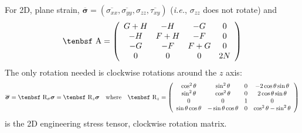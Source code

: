 \documentclass[11pt]{article}
\renewcommand{\vec}[1]{\boldsymbol{#1}}
\def\A{\hbox{\tenbsf A}}
\def\R{\hbox{\tenbsf R}}
\def\s#1{\sigma_{#1}}
\def\t#1{\tau_{#1}}
\begin{document}
For 2D, plane strain, $\overline{\vec\sigma} = (\overline{\s{xx}}, \overline{\s{yy}}, \s{zz}, \overline{\t{xy}})$ ({\em i.e.}, $\s{zz}$ does not rotate) and
\begin{equation}
      \A = \left( \begin{array}{cccc}
                       G+H & -H & -G & 0 \\
                       -H & F+H & -F & 0 \\
                       -G & -F & F+G & 0 \\
                       0 & 0 & 0 & 2N
                       \end{array} \right)
\end{equation}
The only rotation needed is clockwise rotations around the $z$ axis:
\begin{equation}
      \overline{\vec\sigma} = \R_\sigma\vec\sigma = \R_z\vec\sigma  \quad{\rm where}\quad \R_z = \left( \begin{array}{cccc}
                       \cos^2\theta & \sin^2\theta & 0 & -2\cos\theta\sin\theta \\
                       \sin^2\theta & \cos^2\theta & 0 & 2\cos\theta\sin\theta \\
                       0 & 0 & 1 & 0 \\
                       \sin\theta\cos\theta & -\sin\theta\cos\theta & 0 & \cos^2\theta - \sin^2\theta
                       \end{array} \right)
\end{equation}
is the 2D engineering stress tensor, clockwise rotation matrix.
\end{document}
